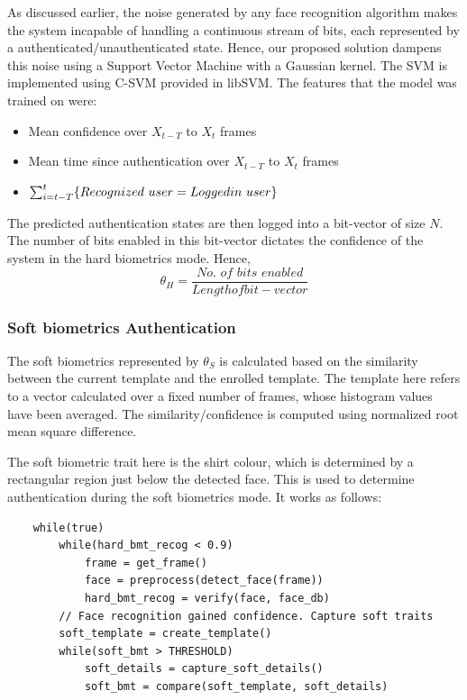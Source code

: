 \documentclass[12pt]{article}			%
\begin{document}
As discussed earlier, the noise generated by any face recognition algorithm makes the system incapable of handling a continuous stream of bits, each represented by a authenticated/unauthenticated state.
Hence, our proposed solution dampens this noise using a Support Vector Machine with a Gaussian kernel.
The SVM is implemented using C-SVM provided in libSVM\cite{libsvm}.
The features that the model was trained on were:
\begin{itemize}
	\item Mean confidence over $X_{t-T}$ to $X_{t}$ frames
	\item Mean time since authentication over $X_{t-T}$ to $X_{t}$ frames
	\item $\sum_{i=t-T}^{t}\{Recognized\ user = Logged\-in\ user\}$
\end{itemize}
The predicted authentication states are then logged into a bit-vector of size $N$.
The number of bits enabled in this bit-vector dictates the confidence of the system in the hard biometrics mode.
Hence,
\begin{equation}
\theta_{H} = \frac {\textit{No. of bits enabled}} {Length of bit-vector}
\end{equation}

\subsubsection{ Soft biometrics Authentication}

The soft biometrics represented by $\theta_{S}$ is calculated based on the similarity between the current template and the enrolled template.
The template here refers to a vector calculated over a fixed number of frames, whose histogram values have been averaged.
The similarity/confidence is computed using normalized root mean square difference.

The soft biometric trait here is the shirt colour, which is determined by a rectangular region just below the detected face. This is used to determine authentication during the soft biometrics mode. It works as follows:\\[2ex]

\begin{verbatim}
    while(true)
        while(hard_bmt_recog < 0.9)
            frame = get_frame()
            face = preprocess(detect_face(frame))
            hard_bmt_recog = verify(face, face_db)
        // Face recognition gained confidence. Capture soft traits
        soft_template = create_template()
        while(soft_bmt > THRESHOLD)
            soft_details = capture_soft_details()
            soft_bmt = compare(soft_template, soft_details)
\end{verbatim}
\end{document}
